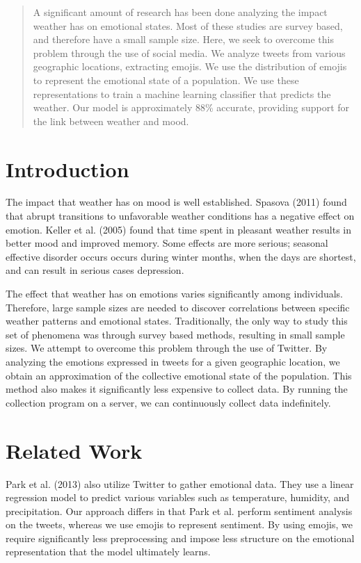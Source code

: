 \documentclass[12pt]{article}
\begin{document}
\maketitle

\begin{abstract}
A significant amount of research has been done analyzing the impact weather has on emotional states. Most of these studies are survey based, and therefore have a small sample size. Here, we seek to overcome this problem through the use of social media. We analyze tweets from various geographic locations, extracting emojis. We use the distribution of emojis to represent the emotional state of a population. We use these representations to train a machine learning classifier that predicts the weather. Our model is approximately 88\% accurate, providing support for the link between weather and mood.
\end{abstract}

\section{Introduction}
The impact that weather has on mood is well established. Spasova (2011) found that abrupt transitions to unfavorable weather conditions has a negative effect on emotion.\cite{Spasova2011} Keller et al. (2005) found that time spent in pleasant weather results in better mood and improved memory.\cite{Keller2005} Some effects are more serious; seasonal effective disorder occurs occurs during winter months, when the days are shortest, and can result in serious cases depression.\cite{Melrose2015}

The effect that weather has on emotions varies significantly among individuals.\cite{Spasova2011} Therefore, large sample sizes are needed to discover correlations between specific weather patterns and emotional states. Traditionally, the only way to study this set of phenomena was through survey based methods, resulting in small sample sizes. We attempt to overcome this problem through the use of Twitter. By analyzing the emotions expressed in tweets for a given geographic location, we obtain an approximation of the collective emotional state of the population. This method also makes it significantly less expensive to collect data. By running the collection program on a server, we can continuously collect data indefinitely.

\section{Related Work}
Park et al. (2013) also utilize Twitter to gather emotional data.\cite{Park2013} They use a linear regression model to predict various variables such as temperature, humidity, and precipitation. Our approach differs in that Park et al. perform sentiment analysis on the tweets, whereas we use emojis to represent sentiment. By using emojis, we require significantly less preprocessing and impose less structure on the emotional representation that the model ultimately learns.
\end{document}
